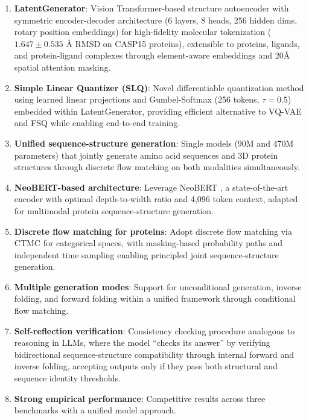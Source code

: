 \documentclass[11pt,a4paper]{article}
\begin{document}
\begin{enumerate}
\item \textbf{LatentGenerator}: Vision Transformer-based structure autoencoder with symmetric encoder-decoder architecture (6 layers, 8 heads, 256 hidden dims, rotary position embeddings) for high-fidelity molecular tokenization ($1.647 \pm 0.535$ Å RMSD on CASP15 proteins), extensible to proteins, ligands, and protein-ligand complexes through element-aware embeddings and 20Å spatial attention masking.

\item \textbf{Simple Linear Quantizer (SLQ)}: Novel differentiable quantization method using learned linear projections and Gumbel-Softmax (256 tokens, $\tau=0.5$) embedded within LatentGenerator, providing efficient alternative to VQ-VAE and FSQ while enabling end-to-end training.

\item \textbf{Unified sequence-structure generation}: Single models (90M and 470M parameters) that jointly generate amino acid sequences and 3D protein structures through discrete flow matching on both modalities simultaneously.

\item \textbf{NeoBERT-based architecture}: Leverage NeoBERT \cite{lebreton2025}, a state-of-the-art encoder with optimal depth-to-width ratio and 4,096 token context, adapted for multimodal protein sequence-structure generation.

\item \textbf{Discrete flow matching for proteins}: Adopt discrete flow matching via CTMC \cite{campbell2024} for categorical spaces, with masking-based probability paths and independent time sampling enabling principled joint sequence-structure generation.

\item \textbf{Multiple generation modes}: Support for unconditional generation, inverse folding, and forward folding within a unified framework through conditional flow matching.

\item \textbf{Self-reflection verification}: Consistency checking procedure analogous to reasoning in LLMs, where the model ``checks its answer'' by verifying bidirectional sequence-structure compatibility through internal forward and inverse folding, accepting outputs only if they pass both structural and sequence identity thresholds.

\item \textbf{Strong empirical performance}: Competitive results across three benchmarks with a unified model approach.
\end{enumerate}
\end{document}
